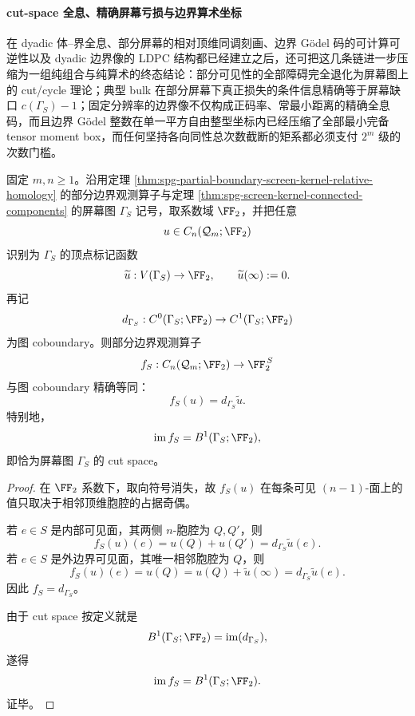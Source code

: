 \paragraph{cut-space 全息、精确屏幕亏损与边界算术坐标}
在 dyadic 体--界全息、部分屏幕的相对顶维同调刻画、边界 Gödel 码的可计算可逆性以及 dyadic 边界像的 LDPC 结构都已经建立之后，还可把这几条链进一步压缩为一组纯组合与纯算术的终态结论：部分可见性的全部障碍完全退化为屏幕图上的 cut/cycle 理论；典型 bulk 在部分屏幕下真正损失的条件信息精确等于屏幕缺口 \(c(\Gamma_S)-1\)；固定分辨率的边界像不仅构成正码率、常最小距离的精确全息码，而且边界 Gödel 整数在单一平方自由整型坐标内已经压缩了全部最小完备 tensor moment box，而任何坚持各向同性总次数截断的矩系都必须支付 \(2^m\) 级的次数门槛。

\begin{theorem}\label{thm:conclusion-partial-screen-trace-cut-space-identification}
固定 \(m,n\ge 1\)。沿用定理 \ref{thm:spg-partial-boundary-screen-kernel-relative-homology} 的部分边界观测算子与定理 \ref{thm:spg-screen-kernel-connected-components} 的屏幕图 \(\Gamma_S\) 记号，取系数域 \(\FF_2\)，并把任意
\[
u\in C_n(\mathcal Q_m;\FF_2)
\]
识别为 \(\Gamma_S\) 的顶点标记函数
\[
\widetilde u:V(\Gamma_S)\to \FF_2,
\qquad
\widetilde u(\infty):=0.
\]
再记
\[
d_{\Gamma_S}:C^0(\Gamma_S;\FF_2)\to C^1(\Gamma_S;\FF_2)
\]
为图 coboundary。则部分边界观测算子
\[
f_S:C_n(\mathcal Q_m;\FF_2)\to \FF_2^{\,S}
\]
与图 coboundary 精确等同：
\[
f_S(u)=d_{\Gamma_S}\widetilde u.
\]
特别地，
\[
\operatorname{im}f_S=B^1(\Gamma_S;\FF_2),
\]
即恰为屏幕图 \(\Gamma_S\) 的 cut space。
\end{theorem}

\begin{proof}
在 \(\FF_2\) 系数下，取向符号消失，故 \(f_S(u)\) 在每条可见 \((n-1)\)-面上的值只取决于相邻顶维胞腔的占据奇偶。

若 \(e\in S\) 是内部可见面，其两侧 \(n\)-胞腔为 \(Q,Q'\)，则
\[
f_S(u)(e)=u(Q)+u(Q')=d_{\Gamma_S}\widetilde u(e).
\]
若 \(e\in S\) 是外边界可见面，其唯一相邻胞腔为 \(Q\)，则
\[
f_S(u)(e)=u(Q)=u(Q)+\widetilde u(\infty)=d_{\Gamma_S}\widetilde u(e).
\]
因此 \(f_S=d_{\Gamma_S}\)。

由于 cut space 按定义就是
\[
B^1(\Gamma_S;\FF_2)=\operatorname{im}(d_{\Gamma_S}),
\]
遂得
\[
\operatorname{im}f_S=B^1(\Gamma_S;\FF_2).
\]
证毕。
\end{proof}

